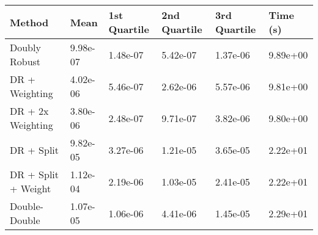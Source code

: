 \begin{tabular}{llllll}
  \toprule
  \textbf{Method} & \textbf{Mean} & \textbf{1st Quartile} & \textbf{2nd Quartile} & \textbf{3rd Quartile} & \textbf{Time (s)} \\ \midrule 
Doubly Robust & \cellcolor{gold!30}9.98e-07 & \cellcolor{gold!30}1.48e-07 & \cellcolor{gold!30}5.42e-07 & \cellcolor{gold!30}1.37e-06 & \cellcolor{bronze!30}9.89e+00\\
DR + Weighting & \cellcolor{bronze!30}4.02e-06 & \cellcolor{bronze!30}5.46e-07 & \cellcolor{bronze!30}2.62e-06 & \cellcolor{bronze!30}5.57e-06 & \cellcolor{silver!30}9.81e+00\\
DR + 2x Weighting & \cellcolor{silver!30}3.80e-06 & \cellcolor{silver!30}2.48e-07 & \cellcolor{silver!30}9.71e-07 & \cellcolor{silver!30}3.82e-06 & \cellcolor{gold!30}9.80e+00\\
DR + Split & 9.82e-05 & 3.27e-06 & 1.21e-05 & 3.65e-05 & 2.22e+01\\
DR + Split + Weight & 1.12e-04 & 2.19e-06 & 1.03e-05 & 2.41e-05 & 2.22e+01\\
Double-Double & 1.07e-05 & 1.06e-06 & 4.41e-06 & 1.45e-05 & 2.29e+01\\
\bottomrule
\end{tabular}